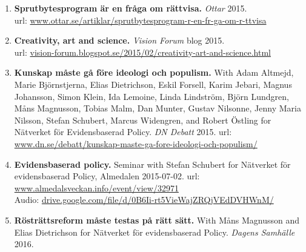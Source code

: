 \documentclass[10pt]{article}
\begin{document}
\begin{enumerate}[nolistsep]
\begin{itemize}[nolistsep]
	\item {\bf Are You an Illusion – betraktelser över svunna kontroverser}. Web: \href{https://www.tidningencurie.se/kronikor/are-you-an-illusion---betraktelser-over-svunna-kontroverser}{tidningencurie.se}
	\item {\bf Kan en biolog laga en radio?} Web: \href{https://www.tidningencurie.se/kronikor/kan-en-biolog-laga-en-radio}{tidningencurie.se}
	\item {\bf Bra förslag om open access men kunskapsvinsten måste vara tydlig}. Web: \href{https://www.tidningencurie.se/kronikor/bra-forslag-om-open-access-men-kunskapsvinsten-maste-vara-tydlig}{tidningencurie.se}
	\item {\bf Cellteorin och medvetandets gåta}. Web: \href{https://www.tidningencurie.se/kronikor/cellteorin-och-medvetandets-gata}{tidningencurie.se}
	\end{itemize}
\item {\bf Sprutbytesprogram är en fråga om rättvisa.} \emph{Ottar} 2015.\\
url: \href{http://www.ottar.se/artiklar/sprutbytesprogram-r-en-fr-ga-om-r-ttvisa}{www.ottar.se/artiklar/sprutbytesprogram-r-en-fr-ga-om-r-ttvisa}
\item {\bf Creativity, art and science.} \emph{Vision Forum} blog 2015.\\
url: \href{hhttp://vision-forum.blogspot.se/2015/02/creativity-art-and-science.html}{vision-forum.blogspot.se/2015/02/creativity-art-and-science.html}
\item {\bf Kunskap måste gå före ideologi och populism.} With Adam Altmejd, Marie Björnstjerna, Elias Dietrichson, Eskil Forsell, Karim Jebari, Magnus Johansson, Simon Klein, Ida Lemoine, Linda Lindström, Björn Lundgren, Måns Magnusson, Tobias Malm, Dan Munter, Gustav Nilsonne, Jenny Maria Nilsson, Stefan Schubert, Marcus Widengren, and Robert Östling for Nätverket för Evidensbaserad Policy. \emph{DN Debatt} 2015.
url: \href{http://www.dn.se/debatt/kunskap-maste-ga-fore-ideologi-och-populism/}{www.dn.se/debatt/kunskap-maste-ga-fore-ideologi-och-populism/}
\item {\bf Evidensbaserad policy.} Seminar with Stefan Schubert for Nätverket för evidensbaserad Policy, Almedalen 2015-07-02.
url: \href{http://www.almedalsveckan.info/event/view/32971}{www.almedalsveckan.info/event/view/32971}\\
Audio: \href{https://drive.google.com/file/d/0B6Ii-rt5VieWajZRQjVEdDVHWnM/edit}{drive.google.com/file/d/0B6Ii-rt5VieWajZRQjVEdDVHWnM/}
\item {\bf Rösträttsreform måste testas på rätt sätt.} With Måns Magnusson and Elias Dietrichson for Nätverket för evidensbaserad Policy. \emph{Dagens Samhälle} 2016.\\

\end{enumerate}
\end{document}
